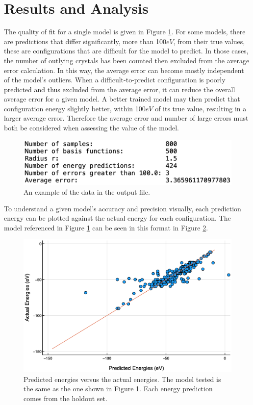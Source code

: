 \section{Results and Analysis}\label{Sect:results}
\par The quality of fit for a single model is given in Figure \ref{outputExample}. For some models, there are predictions that differ significantly, more than 100$eV$, from their true values, these are configurations that are difficult for the model to predict. In those cases, the number of outlying crystals has been counted then excluded from the average error calculation. In this way, the average error can become mostly independent of the model's outliers. When a difficult-to-predict configuration is poorly predicted and thus excluded from the average error, it can reduce the overall average error for a given model. A better trained model may then predict that configuration energy slightly better, within 100$eV$ of its true value, resulting in a larger average error. Therefore the average error and number of large errors must both be considered when assessing the value of the model. 

\begin{figure}[h]
\includegraphics[scale = 0.4]{Figures/outputExample}
\caption{An example of the data in the output file. 
\label{outputExample}} 
\end{figure}

\par To understand a given model's accuracy and precision visually, each prediction energy can be plotted against the actual energy for each configuration. The model referenced in Figure \ref{outputExample} can be seen in this format in Figure \ref{accuracyPlot}.

\begin{figure}[h]
\includegraphics[scale = 0.31]{Figures/accuracyPlot}
\caption{Predicted energies versus the actual energies. The model tested is the same as the one shown in Figure \ref{outputExample}. Each energy prediction comes from the holdout set.
\label{accuracyPlot}} 
\end{figure}

